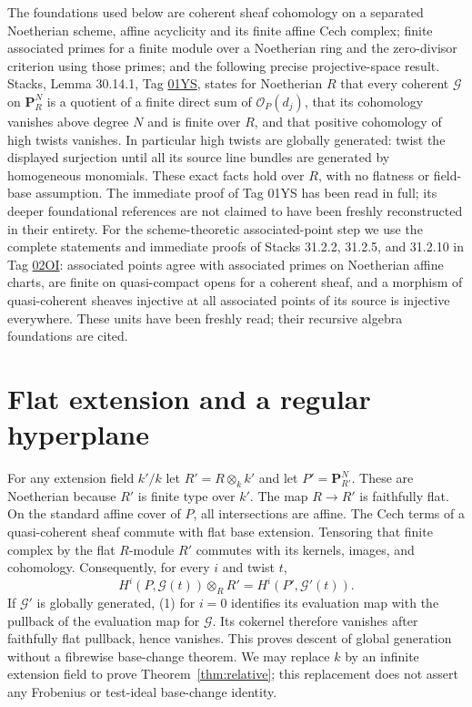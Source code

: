 \documentclass[11pt]{article}
\newcommand{\OO}{\mathcal O}
\newcommand{\GG}{\mathcal G}
\begin{document}
The foundations used below are coherent sheaf cohomology on a separated
Noetherian scheme, affine acyclicity and its finite affine Cech complex;
finite associated primes for a finite module over a Noetherian ring and
the zero-divisor criterion using those primes; and the following precise
projective-space result. Stacks, Lemma 30.14.1, Tag
\href{https://stacks.math.columbia.edu/tag/01YS}{01YS}, states for
Noetherian $R$ that every coherent $\GG$ on $\mathbf P^N_R$ is a quotient
of a finite direct sum of $\OO_P(d_j)$, that its cohomology vanishes
above degree $N$ and is finite over $R$, and that positive cohomology of
high twists vanishes. In particular high twists are globally generated:
twist the displayed surjection until all its source line bundles are
generated by homogeneous monomials. These exact facts hold over $R$,
with no flatness or field-base assumption. The immediate proof of Tag
01YS has been read in full; its deeper foundational references are not
claimed to have been freshly reconstructed in their entirety.
For the scheme-theoretic associated-point step we use the complete
statements and immediate proofs of Stacks 31.2.2, 31.2.5, and 31.2.10
in Tag \href{https://stacks.math.columbia.edu/tag/02OI}{02OI}:
associated points agree with associated primes on Noetherian affine
charts, are finite on quasi-compact opens for a coherent sheaf, and
a morphism of quasi-coherent sheaves injective at all associated
points of its source is injective everywhere. These units have been
freshly read; their recursive algebra foundations are cited.

\section{Flat extension and a regular hyperplane}
For any extension field $k'/k$ let $R'=R\otimes_k k'$ and let
$P'=\mathbf P^N_{R'}$. These are Noetherian because $R'$ is finite type
over $k'$. The map $R\to R'$ is faithfully flat. On the standard affine
cover of $P$, all intersections are affine. The Cech terms of a
quasi-coherent sheaf commute with flat base extension. Tensoring that
finite complex by the flat $R$-module $R'$ commutes with its kernels,
images, and cohomology. Consequently, for every $i$ and twist $t$,
\[
 H^i(P,\GG(t))\otimes_R R'
   =H^i(P',\GG'(t)).                                      \tag{1}
\]
If $\GG'$ is globally generated, (1) for $i=0$ identifies its evaluation
map with the pullback of the evaluation map for $\GG$. Its cokernel
therefore vanishes after faithfully flat pullback, hence vanishes.
This proves descent of global generation without a fibrewise base-change
theorem. We may replace $k$ by an infinite extension field to prove
Theorem~\ref{thm:relative}; this replacement does not assert any
Frobenius or test-ideal base-change identity.
\end{document}
